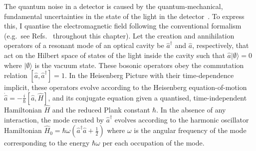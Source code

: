 The quantum noise in a detector is caused by the quantum-mechanical, fundamental uncertainties in the state of the light in the detector~\cite{PhysRevD.23.1693,corbitt_2003}. %
To express this, I quantise the electromagnetic field following the conventional formalism (e.g.\ see Refs.~\cite{danilishinQuantumMeasurementTheory2012,walls_1995} throughout this chapter). Let the creation and annihilation operators of a resonant mode of an optical cavity be $\hat{a}^\dag$ and $\hat{a}$, respectively, that act on the Hilbert space of states of the light inside the cavity such that $\hat{a}\lvert\emptyset\rangle=0$ where $\lvert\emptyset\rangle$ is the vacuum state. These bosonic operators obey the commutation relation $[\hat{a},\hat{a}^\dag]=1$. 
In the Heisenberg Picture with their time-dependence implicit, these operators evolve according to the Heisenberg equation-of-motion $\dot{\hat{a}}=-\frac{i}{\hbar} [\hat a, \hat H]$, and its conjugate equation given a quantised, time-independent Hamiltonian $\hat H$ and the reduced Plank constant $\hbar$. In the absence of any interaction, the mode created by $\hat a^\dag$ evolves according to the harmonic oscillator Hamiltonian $\hat H_0=\hbar\omega(\hat{a}^\dag\hat{a}+\frac{1}{2})$ where $\omega$ is the angular frequency of the mode corresponding to the energy $\hbar\omega$ per each occupation of the mode. %

